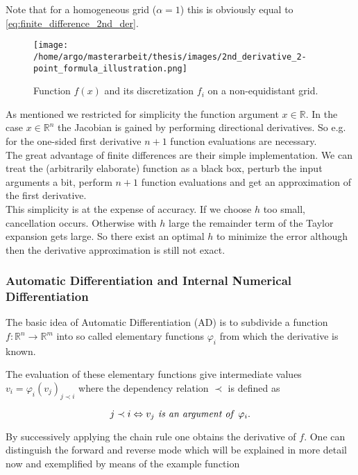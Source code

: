 \documentclass{scrartcl}[12pt, halfparskip]
\numberwithin{equation}{section}
\numberwithin{figure}{section}
\numberwithin{table}{section}
\begin{document}
Note that for a homogeneous grid ($\alpha=1$) this is obviously equal to \cref{eq:finite_difference_2nd_der}. \\

\begin{figure}[H]
	\centering
	\texttt{[image: /home/argo/masterarbeit/thesis/images/2nd\_derivative\_2-point\_formula\_illustration.png]}
	\caption{Function $f(x)$ and its discretization $f_i$ on a non-equidistant grid.}
	\label{fig:2_point_formula_illustration}
\end{figure}


As mentioned we restricted for simplicity the function argument $x \in \mathbb{R}$. In the case $x \in \mathbb{R}^n$ the Jacobian is gained by performing directional derivatives. So e.g. for the one-sided first derivative $n+1$ function evaluations are necessary. \\

The great advantage of finite differences are their simple implementation. We can treat the (arbitrarily elaborate) function as a black box, perturb the input arguments a bit, perform $n+1$ function evaluations and get an approximation of the first derivative. \\
This simplicity is at the expense of accuracy. If we choose $h$ too small, cancellation occurs. Otherwise with $h$ large the remainder term of the Taylor expansion gets large. So there exist an optimal $h$ to minimize the error although then the derivative approximation is still not exact.




\subsubsection{Automatic Differentiation and Internal Numerical Differentiation}
The basic idea of Automatic Differentiation (AD) is to subdivide a function ${f: \mathbb{R}^n \rightarrow \mathbb{R}^m}$ into so called elementary functions $\varphi_i$ from which the derivative is known. 

The evaluation of these elementary functions give intermediate values $v_i = \varphi_i(v_j)_{j \prec i}$ where the dependency relation $\prec$ is defined as

\begin{equation}
j \prec i \Leftrightarrow v_j \text{\textit{ is an argument of }} \varphi_i.
\end{equation}

By successively applying the chain rule one obtains the derivative of $f$.
One can distinguish the forward and reverse mode which will be explained in more detail now and exemplified by means of the example function
\end{document}
